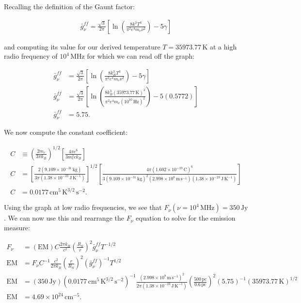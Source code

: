 \documentclass[12pt]{article}
\begin{document}
{\noindent}Recalling the definition of the Gaunt factor:

\begin{equation*}
\begin{split}
\bar{g}_\nu^{ff} = \frac{\sqrt3}{2\pi}\left[\ln\left(\frac{8k^3T^3}{\pi^2e^4m_e\nu^2}\right)-5\gamma\right] 
\end{split}
\end{equation*}

{\noindent}and computing its value for our derived temperature $T = 35973.77\,\mathrm{K}$ at a high radio frequency of $10^4\,\mathrm{MHz}$ for which we can read off the graph:

\begin{equation*}
\begin{split}
\bar{g}_\nu^{ff} &= \frac{\sqrt3}{2\pi}\left[\ln\left(\frac{8k_B^3T^3}{\pi^2e^4m_e\nu^2}\right)-5\gamma\right] \\
\bar{g}_\nu^{ff} &= \frac{\sqrt3}{2\pi}\left[\ln\left(\frac{8k_B^3(35973.77\,\mathrm{K})^3}{\pi^2e^4m_e(10^{10}\,\mathrm{Hz})^2}\right)-5(0.5772)\right] \\
\bar{g}_\nu^{ff} &= 5.75.
\end{split}
\end{equation*}

{\noindent}We now compute the constant coefficient:

\begin{equation*}
\begin{split}
C &\equiv \left(\frac{2m_e}{3\pi k_B}\right)^{1/2}\left[\frac{4\pi e^6}{3m_e^2 c k_B}\right] \\
C &= \left[\frac{2(9.109\times10^{-31}\,\mathrm{kg})}{3\pi (1.38\times10^{-23}\,\mathrm{J\,K^{-1}})}\right]^{1/2}\left[\frac{4\pi (1.602\times10^{-19}\,\mathrm{C})^6}{3(9.109\times10^{-31}\,\mathrm{kg})^2 (2.998\times10^8\,\mathrm{m\,s^{-1}}) (1.38\times10^{-23}\,\mathrm{J\,K^{-1}})}\right] \\
C &= 0.0177\,\mathrm{cm^5\,K^{3/2}\,s^{-2}}.
\end{split}
\end{equation*}

{\noindent}Using the graph at low radio frequencies, we see that $F_\nu(\nu=10^4\,\mathrm{MHz}) = 350\,\mathrm{Jy}$. We can now use this and rearrange the $F_\nu$ equation to solve for the emission measure:

\begin{equation*}
\begin{split}
F_\nu &= (\mathrm{EM})C \frac{2\pi k_B}{c^2} \left(\frac{R_S}{r}\right)^2 \bar{g}_\nu^{ff} T^{-1/2} \\
\mathrm{EM} &= F_\nu C^{-1} \frac{c^2}{2\pi k_B} \left(\frac{r}{R_S}\right)^2 (\bar{g}_\nu^{ff})^{-1} T^{1/2} \\
\mathrm{EM} &= (350\,\mathrm{Jy}) (0.0177\,\mathrm{cm^5\,K^{3/2}\,s^{-2}})^{-1} \frac{(2.998\times10^8\,\mathrm{m\,s^{-1}})^2}{2\pi (1.38\times10^{-23}\,\mathrm{J\,K^{-1}})} \left(\frac{500\,\mathrm{pc}}{0.6\,\mathrm{pc}}\right)^2 (5.75)^{-1} (35973.77\,\mathrm{K})^{1/2} \\
\mathrm{EM} &= 4.69\times10^{24}\,\mathrm{cm^{-5}}.
\end{split}
\end{equation*}
\end{document}
